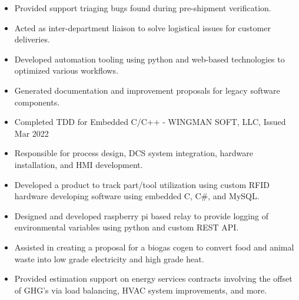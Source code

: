 \documentclass[a4paper,ragged2e,withhyper]{altacv}
\begin{document}
\divider


\begin{itemize}
\item Provided support triaging bugs found during pre-shipment verification.\\
\item Acted as inter-department liaison to solve logistical issues for customer deliveries.\\
\item Developed automation tooling using python and web-based technologies to optimized various workflows.\\
\item Generated documentation and improvement proposals for legacy software components.\\
\item Completed TDD for Embedded C/C++ - WINGMAN SOFT, LLC, Issued Mar 2022\\
\end{itemize}

\divider


\begin{itemize}
\item Responsible for process design, DCS system integration, hardware installation, and HMI development.\\
\item Developed a product to track part/tool utilization using custom RFID hardware developing software using embedded C, C\#, and MySQL.\\
\end{itemize}

\divider


\begin{itemize}
\item Designed and developed raspberry pi based relay to provide logging of environmental variables using python and custom REST API.\\
\item Assisted in creating a proposal for a biogas cogen to convert food and animal waste into low grade electricity and high grade heat.\\
\item Provided estimation support on energy services contracts involving the offset of GHG's via load balancing, HVAC system improvements, and more.\\
\end{itemize}
\end{document}
